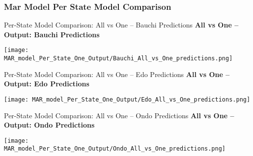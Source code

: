 \documentclass{beamer}
\begin{document}
\subsubsection{Mar Model Per State Model Comparison}
\begin{frame}{Per-State Model Comparison: All vs One – Bauchi Predictions}
\textbf{All vs One – Output: Bauchi Predictions}
\begin{center}
    \texttt{[image: MAR\_model\_Per\_State\_One\_Output/Bauchi\_All\_vs\_One\_predictions.png]}
\end{center}
\end{frame}
%
\begin{frame}{Per-State Model Comparison: All vs One – Edo Predictions}
\textbf{All vs One – Output: Edo Predictions}
\begin{center}
    \texttt{[image: MAR\_model\_Per\_State\_One\_Output/Edo\_All\_vs\_One\_predictions.png]}
\end{center}
\end{frame}

\begin{frame}{Per-State Model Comparison: All vs One – Ondo Predictions}
\textbf{All vs One – Output: Ondo Predictions}
\begin{center}
    \texttt{[image: MAR\_model\_Per\_State\_One\_Output/Ondo\_All\_vs\_One\_predictions.png]}
\end{center}
\end{frame}
\end{document}
